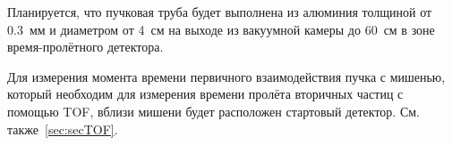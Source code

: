 Планируется, что пучковая труба будет выполнена из алюминия толщиной от 0.3~мм и диаметром от 4~см на выходе из вакуумной камеры до 60~см в зоне время-пролётного детектора.

Для измерения момента времени первичного взаимодействия пучка с мишенью, который необходим для измерения времени пролёта вторичных частиц с помощью TOF, вблизи мишени будет расположен стартовый детектор. См. также~\ref{sec:secTOF}.

